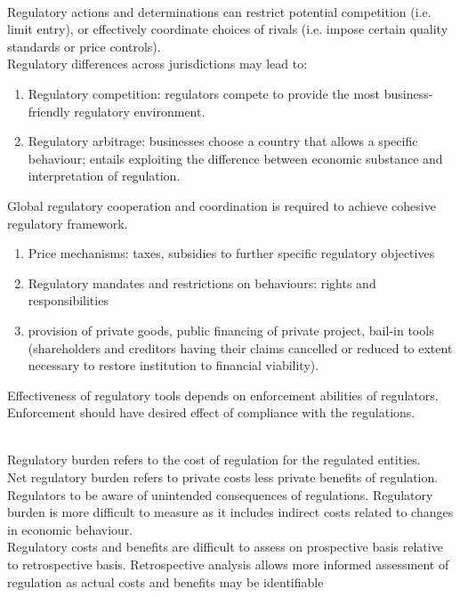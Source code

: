 \begin{definition} \\
Regulatory actions and determinations can restrict potential competition (i.e. limit entry), or effectively coordinate choices of rivals (i.e. impose certain quality standards or price controls).\\
Regulatory differences across jurisdictions may lead to:
\begin{enumerate}[label=\roman*.]
\setlength{\itemsep}{0pt}
\item Regulatory competition: regulators compete to provide the most business-friendly regulatory environment.
\item Regulatory arbitrage: businesses choose a country that allows a specific behaviour; entails exploiting the difference between economic substance and interpretation of regulation.
\end{enumerate}
Global regulatory cooperation and coordination is required to achieve cohesive regulatory framework.
\end{definition}

\begin{remark} 
\begin{enumerate}[label=\roman*.]
\setlength{\itemsep}{0pt}
\item Price mechanisms: taxes, subsidies to further specific regulatory objectives
\item Regulatory mandates and restrictions on behaviours: rights and responsibilities
\item provision of private goods, public financing of private project, bail-in tools (shareholders and creditors having their claims cancelled or reduced to extent necessary to restore institution to financial viability).
\end{enumerate}
Effectiveness of regulatory tools depends on enforcement abilities of regulators.\\
Enforcement should have desired effect of compliance with the regulations.
\end{remark}

\begin{remark} \\
Regulatory burden refers to the cost of regulation for the regulated entities.\\
Net regulatory burden refers to private costs less private benefits of regulation.\\
Regulators to be aware of unintended consequences of regulations. Regulatory burden is more difficult to measure as it includes indirect costs related to changes in economic behaviour.\\
Regulatory costs and benefits are difficult to assess on prospective basis relative to retrospective basis. Retrospective analysis allows more informed assessment of regulation as actual costs and benefits may be identifiable
\end{remark}


